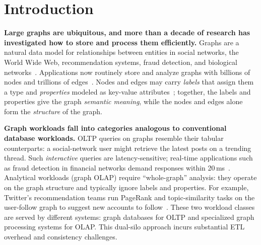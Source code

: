 \chapter{Introduction}
\label{sec:intro}

\textbf{Large graphs are ubiquitous, and more than a decade of research has investigated how to store and process them efficiently.}
Graphs are a natural data model for relationships between entities in social networks, the World Wide Web, recommendation systems, fraud detection, and biological networks~\cite{ubiquityLargeGraphsVLDB2017}.
Applications now routinely store and analyze graphs with billions of nodes and trillions of edges~\cite{ching2015oneTrillion,besta2020demystifying, lin2018shentu, gupta2024graphscale, zhou2025redtao}.
Nodes and edges may carry \emph{labels} that assign them a type and \emph{properties} modeled as key-value attributes~\cite{besta2020demystifying}; together, the labels and properties give the graph \emph{semantic meaning}, while the nodes and edges alone form the \emph{structure} of the graph.

\textbf{Graph workloads fall into categories analogous to conventional database workloads.}
OLTP queries on graphs resemble their tabular counterparts: a social-network user might retrieve the latest posts on a trending thread. %
Such \emph{interactive} queries are latency-sensitive; real-time applications such as fraud detection in financial networks demand responses within 20\,ms~\cite{qiu2018real}.
Analytical workloads (graph OLAP) require ``whole-graph'' analysis: they operate on the graph structure and typically ignore labels and properties.
For example, Twitter's recommendation teams run PageRank and topic-similarity tasks on the user-follow graph to suggest new accounts to follow~\cite{tang2022taming}.
These two workload classes are served by different systems: graph databases for OLTP and specialized graph processing systems for OLAP.
This dual-silo approach incurs substantial ETL overhead and consistency challenges.

